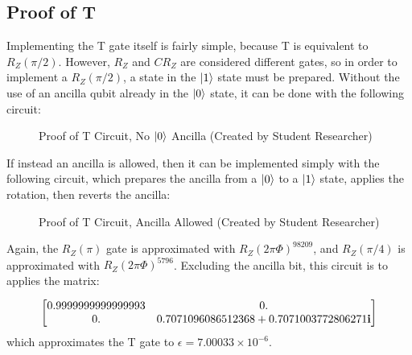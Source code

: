 \documentclass[12pt]{article}
\begin{document}
\subsection{Proof of T}
Implementing the T gate itself is fairly simple, because T is equivalent to $R_Z(\pi/2)$. However, $R_Z$ and $CR_Z$ are considered different gates, so in order to implement a $R_Z(\pi/2)$, a state in the $\ket{1}$ state must be prepared. Without the use of an ancilla qubit already in the $\ket{0}$ state, it can be done with the following circuit:
\begin{figure}[h]
    \centering
    \caption{Proof of T Circuit, No $\ket{0}$ Ancilla (Created by Student Researcher)}
    \label{fig:quantum universal set 1 proof of T circuit}
\end{figure}

If instead an ancilla is allowed, then it can be implemented simply with the following circuit, which prepares the ancilla from a $\ket{0}$ to a $\ket{1}$ state, applies the rotation, then reverts the ancilla:
\begin{figure}[h]
    \centering
    \caption{Proof of T Circuit, Ancilla Allowed (Created by Student Researcher)}
    \label{fig:quantum universal set 1 proof of T circuit}
\end{figure}

Again, the $R_Z(\pi)$ gate is approximated with $R_Z(2\pi \Phi)^{98209}$, and $R_Z(\pi/4)$ is approximated with $R_Z(2\pi \Phi)^{5796}$. Excluding the ancilla bit, this circuit is to applies the matrix:

$$
\scalebox{1}{$
\begin{bmatrix}
    0.9999999999999993&0.\\
    0.&0.7071096086512368+0.7071003772806271\mathbf{i}
\end{bmatrix}
$}
$$
which approximates the T gate to $\epsilon = 7.00033 \times 10^{-6}$.
\end{document}

